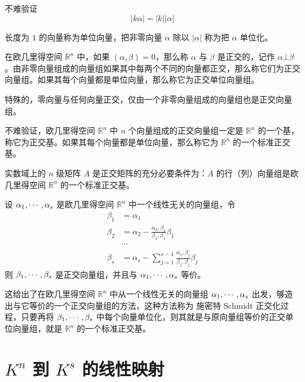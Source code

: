 不难验证
\[|k\alpha| = |k||\alpha|\]

长度为 $1$ 的向量称为单位向量，把非零向量 $\alpha$ 除以 $|\alpha|$ 称为把 $\alpha$ 单位化。

在欧几里得空间 $\mathbb{R}^n$ 中，如果 $(\alpha,\beta)=0$，那么称 $\alpha$ 与 $\beta$ 是正交的，记作 $\alpha \bot \beta$。由非零向量组成的向量组如果其中每两个不同的向量都正交，那么称它们为正交向量组。如果其每个向量都是单位向量，那么称它为正交单位向量组。

特殊的，零向量与任何向量正交，仅由一个非零向量组成的向量组也是正交向量组。

不难验证，欧几里得空间 $\mathbb{R}^n$ 中 $n$ 个向量组成的正交向量组一定是 $\mathbb{R}^n$ 的一个基，称它为正交基。如果其每个向量都是单位向量，那么称它为 $\mathbb{R}^n$ 的一个标准正交基。

\begin{theorem}
	实数域上的 $n$ 级矩阵 $A$ 是正交矩阵的充分必要条件为：$A$ 的行（列）向量组是欧几里得空间 $\mathbb{R}^n$ 的一个标准正交基。
\end{theorem}

\begin{theorem}
	设 $\alpha_1,\cdots,\alpha_s$ 是欧几里得空间 $\mathbb{R}^n$ 中一个线性无关的向量组，令
	\begin{equation*}
		\begin{aligned}
			\beta_1 & =\alpha_1                                                                   \\
			\beta_2 & =\alpha_2 - \frac{\alpha_2,\beta_1}{\beta_1,\beta_1}\beta_1                 \\
			        & \cdots                                                                      \\
			\beta_s & = \alpha_s-\sum_{j=1}^{s-1}\frac{\alpha_s,\beta_j}{\beta_j,\beta_j}\beta_j
		\end{aligned}
	\end{equation*}
	则 $\beta_1,\cdots,\beta_s$ 是正交向量组，并且与 $\alpha_1,\cdots,\alpha_s$ 等价。
\end{theorem}

这给出了在欧几里得空间 $\mathbb{R}^n$ 中从一个线性无关的向量组 $\alpha_1,\cdots,\alpha_s$ 出发，够造出与它等价的一个正交向量组的方法，这种方法称为 施密特 Schmidt 正交化过程，只要再将 $\beta_1,\cdots,\beta_s$ 中每个向量单位化，则其就是与原向量组等价的正交单位向量组，就是 $\mathbb{R}^n$ 的一个标准正交基。

\section{\texorpdfstring{$K^n$ 到 $K^s$ 的线性映射}{Kn 到 Ks 的线性映射}}

